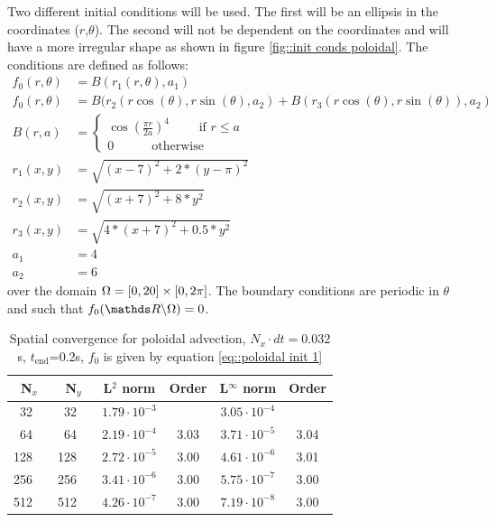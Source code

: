 Two different initial conditions will be used. The first will be an ellipsis in the coordinates ($r$,$\theta$). The second will not be dependent on the coordinates and will have a more irregular shape as shown in figure \ref{fig::init conds poloidal}. The conditions are defined as follows:
\begin{align}
 f_0(r,\theta)&=B(r_1(r,\theta),a_1) \label{eq::poloidal init 1}\\
 f_0(r,\theta)&=B(r_2(r\cos(\theta),r\sin(\theta),a_2)+B(r_3(r\cos(\theta),r\sin(\theta)),a_2) \label{eq::poloidal init 2}\\
 B(r,a) &= 
 \begin{cases}
  \cos\left(\frac{\pi r}{2 a}\right)^4\quad\quad \text{ if }r\leq a\\
  0\quad\quad\quad \text{otherwise}
 \end{cases}\nonumber\\
r_1(x,y) &= \sqrt{(x-7)^2+2*(y-\pi)^2}\nonumber\\
r_2(x,y) &= \sqrt{(x+7)^2+8*y^2}\nonumber\\
r_3(x,y) &= \sqrt{4*(x+7)^2+0.5*y^2}\nonumber\\
a_1 &= 4\nonumber\\
a_2 &= 6\nonumber
\end{align}
over the domain $\Omega=[0,20]\times[0,2\pi]$. The boundary conditions are periodic in $\theta$ and such that $f_0(\reel\backslash\Omega)=0$.

\begin{table}[ht]
\centering
 \begin{tabular}{|r c|r c|c|c|c|c|}
  \hline
  \multicolumn{2}{|c|}{\bf N$_x$} & \multicolumn{2}{|c|}{\bf N$_y$} & \bf L$^2$ norm       & \bf Order & \bf L$^\infty$ norm  & \bf Order\\
  \hline
  \hline
  32  & &  32     & & $ 1.79 \cdot 10^{ -3 }$ &       & $ 3.05 \cdot 10^{ -4 }$ &  \\
  \hline
  64  & &  64     & & $ 2.19 \cdot 10^{ -4 }$ &  3.03  & $ 3.71 \cdot 10^{ -5 }$ &  3.04  \\
  \hline
  128  & &  128     & & $ 2.72 \cdot 10^{ -5 }$ &  3.00  & $ 4.61 \cdot 10^{ -6 }$ &  3.01  \\
  \hline
  256  & &  256     & & $ 3.41 \cdot 10^{ -6 }$ &  3.00  & $ 5.75 \cdot 10^{ -7 }$ &  3.00  \\
  \hline
  512  & &  512     & & $ 4.26 \cdot 10^{ -7 }$ &  3.00  & $ 7.19 \cdot 10^{ -8 }$ &  3.00  \\
  \hline
 \end{tabular}
 \caption{\label{Poloidal dx convergence eq1} Spatial convergence for poloidal advection, $N_x\cdot dt = 0.032$ s, $t_{\text{end}}$=0.2s, $f_0$ is given by equation \ref{eq::poloidal init 1}}
\end{table}

